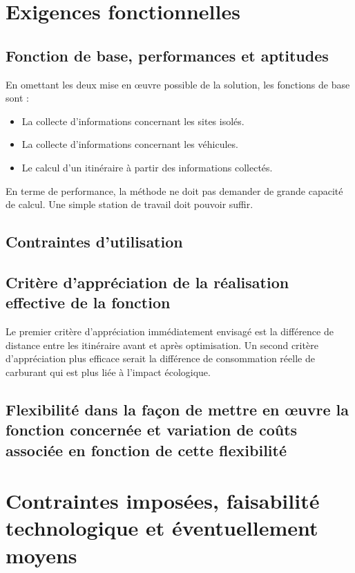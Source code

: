 \section{Exigences fonctionnelles}

    \subsection{Fonction de base, performances et aptitudes}

        En omettant les deux mise en œuvre possible de la solution, les fonctions de base sont :
        \begin{itemize}
            \item La collecte d'informations concernant les sites isolés.
            \item La collecte d'informations concernant les véhicules.
            \item Le calcul d'un itinéraire à partir des informations collectés.
        \end{itemize}
        
        En terme de performance, la méthode ne doit pas demander de grande capacité de calcul.
        Une simple station de travail doit pouvoir suffir.

    \subsection{Contraintes d'utilisation}
    
    
    \subsection{Critère d'appréciation de la réalisation effective de la fonction}
    
        Le premier critère d'appréciation immédiatement envisagé est la différence de distance entre les itinéraire avant et après optimisation.
        Un second critère d'appréciation plus efficace serait la différence de consommation réelle de carburant qui est plus liée à l'impact écologique.
    
    \subsection{Flexibilité dans la façon de mettre en œuvre la fonction concernée et variation de coûts associée en fonction de cette flexibilité}

\section{Contraintes imposées, faisabilité technologique et éventuellement moyens}

